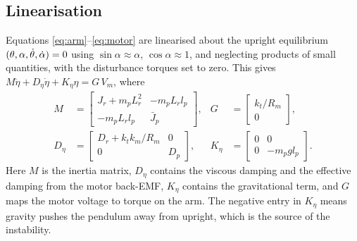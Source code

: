 \subsection{Linearisation}
Equations \eqref{eq:arm}--\eqref{eq:motor} are linearised about the upright equilibrium $(\theta,\alpha,\dot\theta,\dot\alpha)=0$ using $\sin\alpha\approx\alpha$, $\cos\alpha\approx1$, and neglecting products of small quantities, with the disturbance torques set to zero. This gives $M\ddot\eta+D_\eta\dot\eta+K_\eta\eta=G\,V_m$, where
\begin{align}
M&=\begin{bmatrix}J_r+m_pL_r^2&-m_pL_rl_p\\-m_pL_rl_p&\bar J_p\end{bmatrix}, & G&=\begin{bmatrix}k_t/R_m\\0\end{bmatrix},\\
D_\eta&=\begin{bmatrix}D_r+k_tk_m/R_m&0\\0&D_p\end{bmatrix}, & K_\eta&=\begin{bmatrix}0&0\\0&-m_pgl_p\end{bmatrix}.
\end{align}
Here $M$ is the inertia matrix, $D_\eta$ contains the viscous damping and the effective damping from the motor back-EMF, $K_\eta$ contains the gravitational term, and $G$ maps the motor voltage to torque on the arm. The negative entry in $K_\eta$ means gravity pushes the pendulum away from upright, which is the source of the instability.

